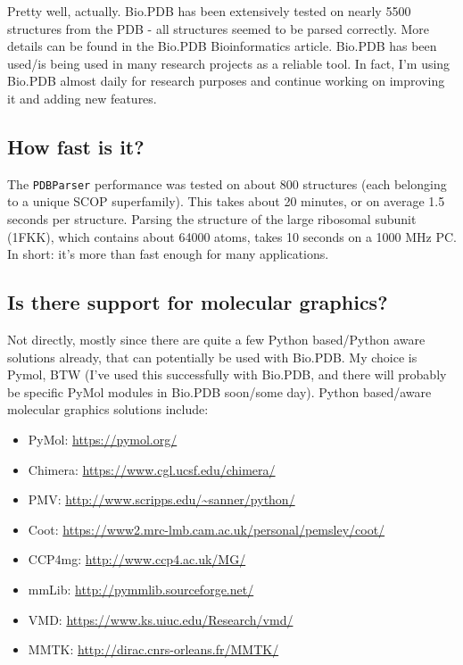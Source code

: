 Pretty well, actually. Bio.PDB has been extensively tested on nearly
5500 structures from the PDB - all structures seemed to be parsed
correctly. More details can be found in the Bio.PDB Bioinformatics
article. Bio.PDB has been used/is being used in many research projects
as a reliable tool. In fact, I'm using Bio.PDB almost daily for research
purposes and continue working on improving it and adding new features.

\subsection{How fast is it?}

The \texttt{PDBParser} performance was tested on about 800 structures
(each belonging to a unique SCOP superfamily). This takes about 20
minutes, or on average 1.5 seconds per structure. Parsing the structure
of the large ribosomal subunit (1FKK), which contains about 64000
atoms, takes 10 seconds on a 1000 MHz PC. In short: it's more than
fast enough for many applications.

\subsection{Is there support for molecular graphics?}

Not directly, mostly since there are quite a few Python based/Python
aware solutions already, that can potentially be used with Bio.PDB.
My choice is Pymol, BTW (I've used this successfully with Bio.PDB,
and there will probably be specific PyMol modules in Bio.PDB soon/some
day). Python based/aware molecular graphics solutions include:

\begin{itemize}
\item PyMol: \url{https://pymol.org/}
\item Chimera: \url{https://www.cgl.ucsf.edu/chimera/}
\item PMV: \url{http://www.scripps.edu/~sanner/python/}
\item Coot: \url{https://www2.mrc-lmb.cam.ac.uk/personal/pemsley/coot/}
\item CCP4mg: \url{http://www.ccp4.ac.uk/MG/}
\item mmLib: \url{http://pymmlib.sourceforge.net/}
\item VMD: \url{https://www.ks.uiuc.edu/Research/vmd/}
\item MMTK: \url{http://dirac.cnrs-orleans.fr/MMTK/}
\end{itemize}

